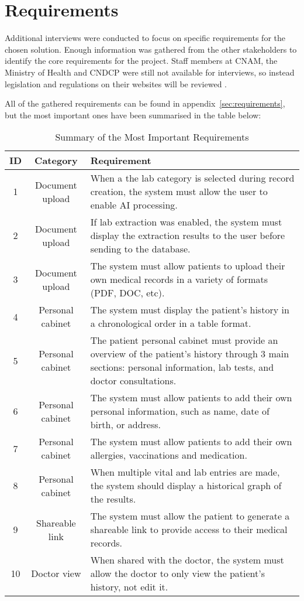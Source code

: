 \clearpage

\section{Requirements}

Additional interviews were conducted to focus on specific requirements for the chosen solution. Enough information was gathered from the other stakeholders to identify the core requirements for the project. Staff members at CNAM, the Ministry of Health and CNDCP were still not available for interviews, so instead legislation and regulations on their websites will be reviewed \parencite{CNAM,CNPDCP,ministry}. 

All of the gathered requirements can be found in appendix~\ref{sec:requirements}, but the most important ones have been summarised in the table below:

\begin{table}[h!]
    \centering
    \begin{tabular}{|c|c|p{}|}
    \hline
    \textbf{ID} & \textbf{Category}                  & \textbf{Requirement}                                                                \\ \hline
    1   & Document upload & When a the lab category is selected during record creation, the system must allow the user to enable AI processing.       \\ \hline
    2   & Document upload & If lab extraction was enabled, the system must display the extraction results to the user before sending to the database. \\ \hline
    3   & Document upload & The system must allow patients to upload their own medical records in a variety of formats (PDF, DOC, etc). \\ \hline
    4  & Personal cabinet & The system must display the patient's history in a chronological order in a table format. \\ \hline
    5   & Personal cabinet & The patient personal cabinet must provide an overview of the patient's history through 3 main sections: personal information, lab tests, and doctor consultations. \\ \hline
    6  & Personal cabinet & The system must allow patients to add their own personal information, such as name, date of birth, or address. \\ \hline
    7  & Personal cabinet & The system must allow patients to add their own allergies, vaccinations and medication. \\ \hline
    8   & Personal cabinet & When multiple vital and lab entries are made, the system should display a historical graph of the results. \\ \hline
    9   & Shareable link & The system must allow the patient to generate a shareable link to provide access to their medical records. \\ \hline
    10   & Doctor view & When shared with the doctor, the system must allow the doctor to only view the patient's history, not edit it. \\ \hline
    \end{tabular}
    \caption{Summary of the Most Important Requirements}
\end{table}
    
    
    
    